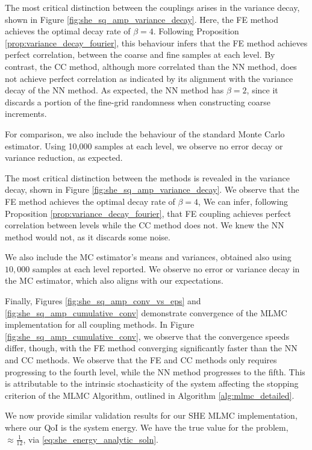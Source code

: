 The most critical distinction between the couplings arises in the variance decay, 
shown in Figure \ref{fig:she_sq_amp_variance_decay}. Here, the FE method 
achieves the optimal decay rate of $\beta = 4$. Following Proposition 
\ref{prop:variance_decay_fourier}, this behaviour infers that the FE method 
achieves perfect correlation, between the coarse and fine samples at each level. 
By contrast, the CC method,
although more correlated than the NN method, does not 
achieve perfect correlation as indicated by its alignment with the 
variance decay of the NN method. As expected, the NN method 
has $\beta = 2$, since it discards a portion of the fine-grid randomness when 
constructing coarse increments.

For comparison, we also include the behaviour of the standard Monte Carlo 
estimator. Using 10,000 samples at each level, we observe no error decay 
or variance reduction, as expected.

The most critical distinction between the methods is revealed in the variance decay,
shown in Figure \ref{fig:she_sq_amp_variance_decay}. We observe that the FE method
achieves the optimal decay rate of $\beta = 4$, 
We can infer, following 
Proposition \ref{prop:variance_decay_fourier}, that FE coupling achieves 
perfect correlation between levels while the CC method does not. We knew the 
NN method would not, as it discards some noise.

We also include the MC estimator's means and variances, obtained also using $10,000$ samples
at each level reported. We observe no error or variance decay in the MC estimator, which 
also aligns with our expectations.

Finally, Figures \ref{fig:she_sq_amp_conv_vs_eps} and \ref{fig:she_sq_amp_cumulative_conv}
demonstrate convergence of the MLMC implementation for all coupling methods.
In Figure \ref{fig:she_sq_amp_cumulative_conv}, we observe that 
the convergence speeds differ, though, with the FE method converging significantly
faster than the NN and CC methods. We observe that the FE and CC methods only requires progressing 
to the fourth level, while the NN method progresses to the fifth. This is attributable 
to the intrinsic stochasticity of the system affecting the stopping criterion 
of the MLMC Algorithm, outlined in Algorithm \ref{alg:mlmc_detailed}.

We now provide similar validation results for our SHE MLMC implementation, where our QoI is the system energy. 
We have the true value for the problem, $\approx \frac{1}{12}$, via
\ref{eq:she_energy_analytic_soln}.

